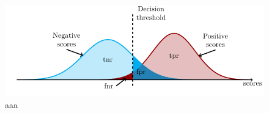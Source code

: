 \begin{figure}[!ht]
  \centering
  \includegraphics[width=\linewidth]{images/confusion_rates.pdf}
  \caption{aaa}
  \label{fig: scores and rates}
\end{figure}